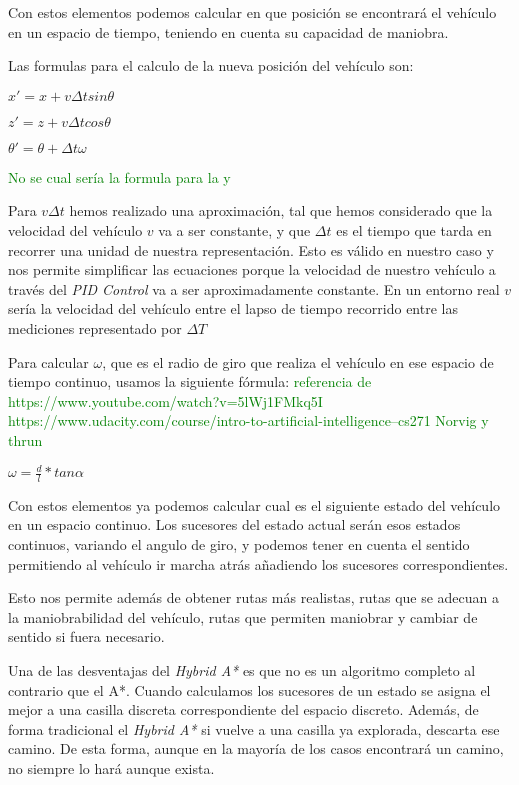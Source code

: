 Con estos elementos podemos calcular en que posición se encontrará el vehículo en un espacio de tiempo, teniendo en cuenta su capacidad de maniobra.

Las formulas para el calculo de la nueva posición del vehículo son:
\begin{center}
$x' = x +  v \Delta t sin \theta$

$z' = z +  v \Delta t cos \theta$

$\theta' = \theta + \Delta t \omega $
\end{center}

\textcolor{green}{No se cual sería la formula para la y}

Para $v \Delta t$ hemos realizado una aproximación, tal que hemos considerado que la velocidad del vehículo $v$ va a ser constante, y que $\Delta t$ es el tiempo que tarda en recorrer una unidad de nuestra representación. Esto es válido en nuestro caso y nos permite simplificar las ecuaciones porque la velocidad de nuestro vehículo a través del \textit{PID Control} va a ser aproximadamente constante. En un entorno real $v$ sería la velocidad del vehículo entre el lapso de tiempo recorrido entre las mediciones representado por $\Delta T$ 

Para calcular $\omega$, que es el radio de giro que realiza el vehículo en ese espacio de tiempo continuo, usamos la siguiente fórmula:
\textcolor{green}{referencia de https://www.youtube.com/watch?v=5lWj1FMkq5I  https://www.udacity.com/course/intro-to-artificial-intelligence--cs271 Norvig y thrun}
\begin{center}
$\omega = \displaystyle \frac{d}{l} * tan \alpha  $
\end{center}

Con estos elementos ya podemos calcular cual es el siguiente estado del vehículo en un espacio continuo. Los sucesores del estado actual serán esos estados continuos, variando el angulo de giro, y podemos tener en cuenta el sentido permitiendo al vehículo ir marcha atrás añadiendo los sucesores correspondientes.

Esto nos permite además de obtener rutas más realistas, rutas que se adecuan a la maniobrabilidad del vehículo,  rutas que permiten maniobrar y cambiar de sentido si fuera necesario.

Una de las desventajas del \textit{Hybrid A*} es que no es un algoritmo completo al contrario que el A*. Cuando calculamos los sucesores de un estado se asigna el mejor a una casilla discreta correspondiente del espacio discreto. Además, de forma tradicional el \textit{Hybrid A*} si vuelve a una casilla ya explorada, descarta ese camino. De esta forma, aunque en la mayoría de los casos encontrará un camino, no siempre lo hará aunque exista.

